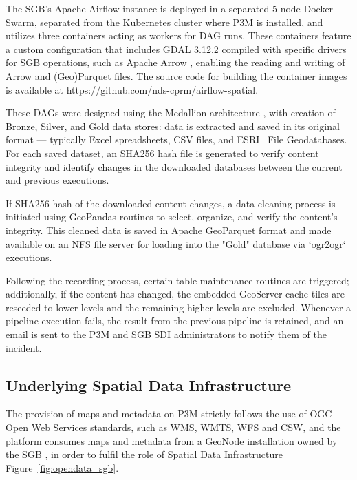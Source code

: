 \documentclass{isprs} %
\begin{document}
The SGB's Apache Airflow instance is deployed in a separated 5-node Docker Swarm, separated from the Kubernetes cluster where P3M is installed, and utilizes three containers acting as workers for DAG runs. These containers feature a custom configuration that includes GDAL 3.12.2 compiled with specific drivers for SGB operations, such as Apache Arrow \cite{apachearrow}, enabling the reading and writing of Arrow and (Geo)Parquet files. The source code for building the container images is available at https://github.com/nds-cprm/airflow-spatial.

These DAGs were designed using the Medallion architecture \cite{medallion}, with creation of Bronze, Silver, and Gold data stores: data is extracted and saved in its original format — typically Excel spreadsheets, CSV files, and ESRI\textregistered~ File Geodatabases. For each saved dataset, an SHA256 hash file is generated to verify content integrity and identify changes in the downloaded databases between the current and previous executions.

If SHA256 hash of the downloaded content changes, a data cleaning process is initiated using GeoPandas \cite{geopandas} routines to select, organize, and verify the content's integrity. This cleaned data is saved in Apache GeoParquet format and made available on an NFS file server for loading into the "Gold" database via `ogr2ogr` executions.

Following the recording process, certain table maintenance routines are triggered; additionally, if the content has changed, the embedded GeoServer cache tiles are reseeded to lower levels and the remaining higher levels are excluded. Whenever a pipeline execution fails, the result from the previous pipeline is retained, and an email is sent to the P3M and SGB SDI administrators to notify them of the incident.


\subsection{Underlying Spatial Data Infrastructure}\label{sec:UNDERLYING_SPATIAL_DATA_INFRASTRUCTURE}

The provision of maps and metadata on P3M strictly follows the use of OGC Open Web Services standards, such as WMS, WMTS, WFS and CSW, and the platform consumes maps and metadata from a GeoNode \cite{geonode_contributors} installation owned by the SGB \cite{mota2024}, in order to fulfil the role of Spatial Data Infrastructure Figure~\ref{fig:opendata_sgb}.
\end{document}
